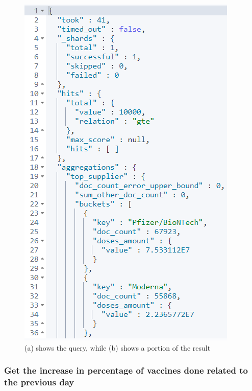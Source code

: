 \documentclass{article}[IEEEtran]
\begin{document}
\begin{figure}[H]
\begin{center}
\begin{minipage}[b]{0.4\textwidth}
    \includegraphics[width=\textwidth, frame]{Answer_Query_5.PNG}
     \subcaption{}
  \end{minipage}
  \caption{(a) shows the query, while (b) shows a portion of the result}
\end{center}
\end{figure}

\newpage

\subsubsection{Get the increase in percentage of vaccines done related to the previous day}\label{ssec:q12}
\end{document}
